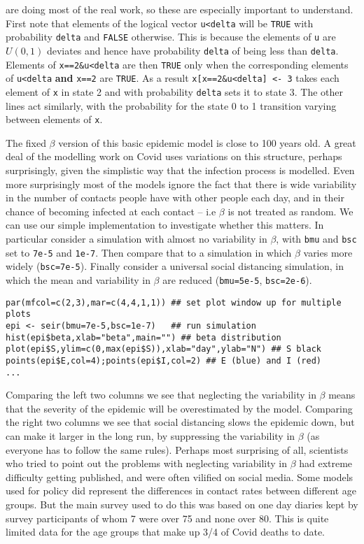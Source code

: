 \documentclass[10pt] {article}
\newcommand{\eps}[3]
{{\begin{center}
 \rotatebox{#1}{\scalebox{#2}{\texttt{[image: \#3]}}}
 \end{center}}
}
\theoremstyle{definition}
\begin{document}
are doing most of the real work, so these are especially important to understand. First note that elements of the logical vector \lstinline+u<delta+ will be {\tt TRUE} with probability {\tt delta} and {\tt FALSE} otherwise. This is because the elements of {\tt u} are $U(0,1)$ deviates and hence have probability {\tt delta} of being less than {\tt delta}. Elements of \lstinline+x==2&u<delta+ are then {\tt TRUE} only when the corresponding elements of \lstinline+u<delta+ {\bf and} \lstinline+x==2+ are {\tt TRUE}. As a result  \lstinline+x[x==2&u<delta] <- 3+ takes each element of {\tt x} in state 2 and with probability {\tt delta} sets it to state 3. The other lines act similarly, with the probability for the state 0 to 1 transition varying between elements of {\tt x}. 

The fixed $\beta$ version of this basic epidemic model is close to 100 years old. A great deal of the modelling work on Covid uses variations on this structure, perhaps surprisingly, given the simplistic way that the infection process is modelled. Even more surprisingly most of the models ignore the fact that there is wide variability in the number of contacts people have with other people each day, and in their chance of becoming infected at each contact -- i.e $\beta$ is not treated as random. We can use our simple implementation to investigate whether this matters. In particular consider a simulation with almost no variability in $\beta$, with {\tt bmu} and {\tt bsc} set to {\tt 7e-5} and {\tt 1e-7}. Then compare that to a simulation in which $\beta$ varies more widely (\lstinline+bsc=7e-5+). Finally consider a universal social distancing simulation, in which the mean and variability in $\beta$ are reduced (\lstinline+bmu=5e-5+, \lstinline+bsc=2e-6+).  
\begin{lstlisting}
par(mfcol=c(2,3),mar=c(4,4,1,1)) ## set plot window up for multiple plots
epi <- seir(bmu=7e-5,bsc=1e-7)   ## run simulation
hist(epi$beta,xlab="beta",main="") ## beta distribution
plot(epi$S,ylim=c(0,max(epi$S)),xlab="day",ylab="N") ## S black
points(epi$E,col=4);points(epi$I,col=2) ## E (blue) and I (red)
...
\end{lstlisting}
\eps{-90}{.6}{seir.eps}
Comparing the left two columns we see that neglecting the variability in $\beta$ means that the severity of the epidemic will be overestimated by the model. Comparing the right two columns we see that social distancing slows the epidemic down, but can make it larger in the long run, by suppressing the variability in $\beta$ (as everyone has to follow the same rules). Perhaps most surprising of all, scientists who tried to point out the problems with neglecting variability in $\beta$ had extreme difficulty getting published, and were often vilified on social media. Some models used for policy did represent the differences in contact rates between different age groups. But the main survey used to do this was based on one day diaries kept by survey participants of whom 7 were over 75 and none over 80. This is quite limited data for the age groups that make up 3/4 of Covid deaths to date. 
\end{document}
